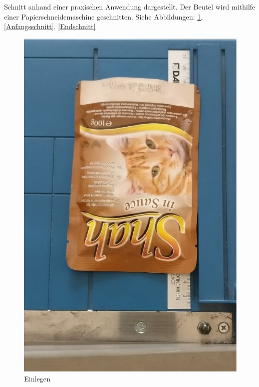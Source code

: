 Schnitt anhand einer praxischen Anwendung dargestellt. Der Beutel wird mithilfe einer Papierschneidemaschine geschnitten. Siehe Abbildungen: \ref{Einlegen}, \ref{Anfangsschnitt}, \ref{Endschnitt}

\begin{figure}[H]
   \begin{minipage}[hbt]{.3\linewidth} %
      \includegraphics[width=\linewidth]{Bilder/Schneideversuch_1.Art/Einlegen}
      \caption{Einlegen}
      \label{Einlegen} 
   \end{minipage}
   \hspace{.2\linewidth}%
   \begin{minipage}[hbt]{.5\linewidth} %

\end{minipage}
\end{figure}
